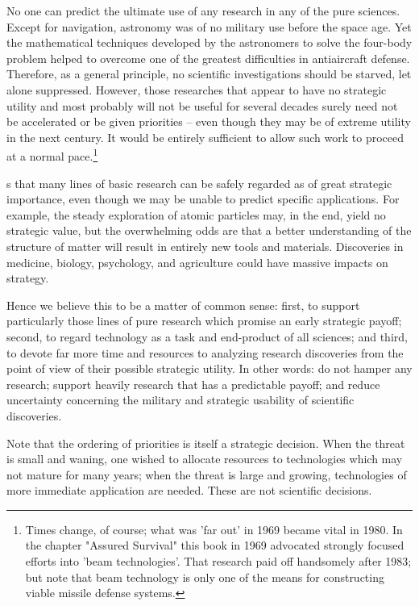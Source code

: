 No one can predict the ultimate use of any research in any of the pure sciences. Except for navigation, astronomy was of no military use before the space age. Yet the mathematical techniques developed by the astronomers to solve the four-body problem helped to overcome one of the greatest difficulties in antiaircraft defense. Therefore, as a general principle, no scientific investigations should be starved, let alone suppressed. However, those researches that appear to have no strategic utility and most probably will not be useful for several decades surely need not be accelerated or be given priorities -- even though they may be of extreme utility in the next century. It would be entirely sufficient to allow such work to proceed at a normal pace.\footnote{Times change, of course; what was 'far out' in 1969 became vital in 1980. In the chapter "Assured Survival" this book in 1969 advocated strongly focused efforts into 'beam technologies'. That research paid off handsomely after 1983; but note that beam technology is only one of the means for constructing viable missile defense systems.}

s that many lines of basic research can be safely regarded as of great strategic importance, even though we may be unable to predict specific applications. For example, the steady exploration of atomic particles may, in the end, yield no strategic value, but the overwhelming odds are that a better understanding of the structure of matter will result in entirely new tools and materials. Discoveries in medicine, biology, psychology, and agriculture could have massive impacts on strategy.

Hence we believe this to be a matter of common sense: first, to support particularly those lines of pure research which promise an early strategic payoff; second, to regard technology as a task and end-product of all sciences; and third, to devote far more time and resources to analyzing research discoveries from the point of view of their possible strategic utility. In other words: do not hamper any research; support heavily research that has a predictable payoff; and reduce uncertainty concerning the military and strategic usability of scientific discoveries.

Note that the ordering of priorities is itself a strategic decision. When the threat is small and waning, one wished to allocate resources to technologies which may not mature for many years; when the threat is large and growing, technologies of more immediate application are needed. These are not scientific decisions.

